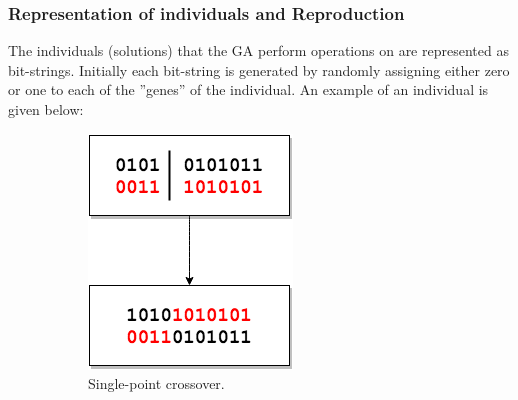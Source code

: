 \documentclass{article}
\begin{document}
\subsubsection{Representation of individuals and Reproduction}
The individuals (solutions) that the GA perform operations on are represented as bit-strings. Initially each bit-string is generated by randomly assigning either zero or one to each of the ''genes'' of the individual. An example of an individual is given below:


\begin{figure}[h!]
    \centering
    \begin{subfigure}[b]{0.3\textwidth}
        \includegraphics[width=\textwidth]{"Single Point Crossover"}
        \caption{Single-point crossover.}
        \label{fig:gull}
    \end{subfigure}
    ~ %
    \begin{subfigure}[b]{0.3\textwidth}

\end{subfigure}
\end{figure}
\end{document}
